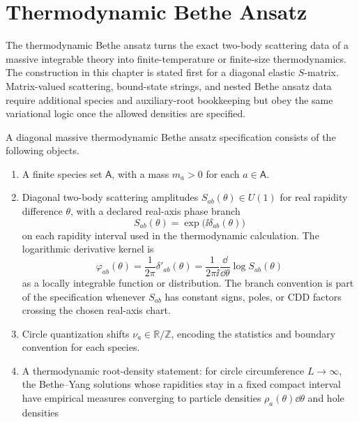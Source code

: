\chapter{Thermodynamic Bethe Ansatz}
\label{ch:integrable-thermodynamic-bethe-ansatz}

\ConventionsLorentzian

The thermodynamic Bethe ansatz turns the exact two-body scattering data of a
massive integrable theory into finite-temperature or finite-size
thermodynamics.  The construction in this chapter is stated first for a
diagonal elastic \(S\)-matrix.  Matrix-valued scattering, bound-state strings,
and nested Bethe ansatz data require additional species and auxiliary-root
bookkeeping but obey the same variational logic once the allowed densities
are specified.

\begin{definition}
\label{def:diagonal-massive-tba-datum}
A diagonal massive thermodynamic Bethe ansatz specification consists of the following
objects.
\begin{enumerate}[label=\textup{(\roman*)}]
\item A finite species set \(\mathsf A\), with a mass
      \(m_a>0\) for each \(a\in\mathsf A\).
\item Diagonal two-body scattering amplitudes
      \(S_{ab}(\theta)\in U(1)\) for real rapidity difference
      \(\theta\), with a declared real-axis phase branch
      \[
        S_{ab}(\theta)=\exp\bigl(\ii\delta_{ab}(\theta)\bigr)
      \]
      on each rapidity interval used in the thermodynamic calculation.  The
      logarithmic derivative kernel is
      \[
        \varphi_{ab}(\theta)
        =
        \frac{1}{2\pi}\delta'_{ab}(\theta)
        =
        \frac{1}{2\pi\ii}\frac{\dd}{\dd\theta}\log S_{ab}(\theta)
      \]
      as a locally integrable function or distribution.  The branch convention
      is part of the specification whenever \(S_{ab}\) has constant signs, poles, or
      CDD factors crossing the chosen real-axis chart.
\item Circle quantization shifts
      \(\nu_a\in\mathbb R/\mathbb Z\), encoding the statistics and boundary
      convention for each species.
\item A thermodynamic root-density statement: for circle circumference
      \(L\to\infty\), the Bethe--Yang solutions whose rapidities stay in a
      fixed compact interval have empirical measures converging to particle
      densities \(\rho_a(\theta)\dd\theta\) and hole densities

\end{enumerate}
\end{definition}
